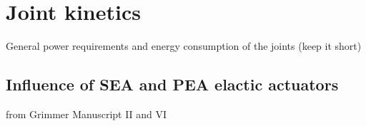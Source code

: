 \section{Joint kinetics} %
\label{sec:joint_kinetics}
General power requirements and energy consumption of the joints (keep it short)

\subsection{Influence of SEA and PEA elactic actuators} %
\label{sub:influence_of_sea_and_pea_elactic_actuators}
 from Grimmer Manuscript II and VI



